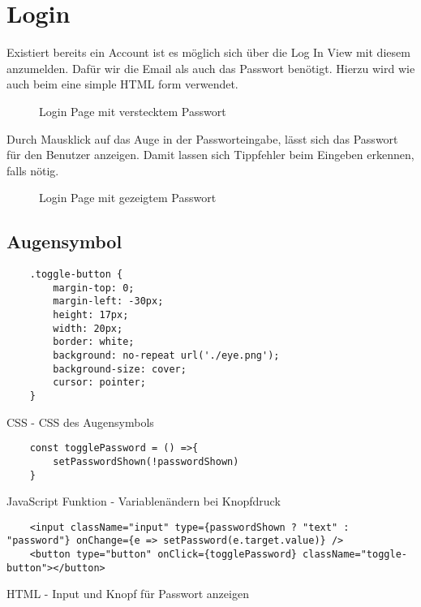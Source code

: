 \pagebreak
\section{Login}
\label{login}

Existiert bereits ein Account ist es möglich sich über die Log In View mit diesem anzumelden. Dafür 
wir die Email als auch das Passwort benötigt. Hierzu wird wie auch beim  eine 
simple HTML form verwendet. 

\begin{figure}[H]
    \begin{center}
      \caption{Login Page mit verstecktem Passwort}
    \end{center}
\end{figure}

Durch Mausklick auf das Auge in der Passworteingabe, lässt sich das Passwort für den Benutzer
anzeigen. Damit lassen sich Tippfehler beim Eingeben erkennen, falls nötig. 

\begin{figure}[H]
    \begin{center}
      \caption{Login Page mit gezeigtem Passwort}
    \end{center}
\end{figure}

\subsection{Augensymbol}
\begin{code}[htp]
\begin{lstlisting}
    .toggle-button {
        margin-top: 0;
        margin-left: -30px;
        height: 17px;
        width: 20px;
        border: white;
        background: no-repeat url('./eye.png');
        background-size: cover;
        cursor: pointer;
    }
\end{lstlisting}
\caption{CSS -  CSS des Augensymbols}
\end{code}
\begin{code}[htp]
\begin{lstlisting}
    const togglePassword = () =>{
        setPasswordShown(!passwordShown)
    }
\end{lstlisting}
\caption{JavaScript Funktion -  Variablenändern bei Knopfdruck}
\end{code}
\begin{code}[htp]
\begin{lstlisting}
    <input className="input" type={passwordShown ? "text" : "password"} onChange={e => setPassword(e.target.value)} />
    <button type="button" onClick={togglePassword} className="toggle-button"></button>
\end{lstlisting}
\caption{HTML - Input und Knopf für Passwort anzeigen}
\end{code}

